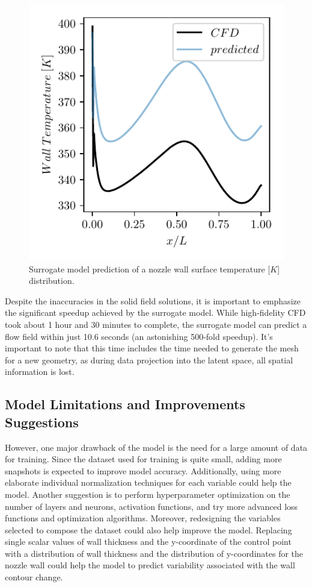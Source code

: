 \documentclass[10pt,oneside,a4paper,twocolumn]{article}
\begin{document}
\begin{figure}[htbp]
  \centering
  \includegraphics[width=\columnwidth]{figures/predicted_wall_temperature.pdf}
  \caption{Surrogate model prediction of a nozzle wall surface temperature [$K$] distribution.}
  \label{fig:wall_temperature_solid_wall}
\end{figure}

Despite the inaccuracies in the solid field solutions, it is important to emphasize the significant speedup achieved by the surrogate model. While high-fidelity CFD took about 1 hour and 30 minutes to complete, the surrogate model can predict a flow field within just 10.6 seconds (an astonishing 500-fold speedup). It's important to note that this time includes the time needed to generate the mesh for a new geometry, as during data projection into the latent space, all spatial information is lost.

\subsection{Model Limitations and Improvements Suggestions}

However, one major drawback of the model is the need for a large amount of data for training. Since the dataset used for training is quite small, adding more snapshots is expected to improve model accuracy. Additionally, using more elaborate individual normalization techniques for each variable could help the model. Another suggestion is to perform hyperparameter optimization on the number of layers and neurons, activation functions, and try more advanced loss functions and optimization algorithms. Moreover, redesigning the variables selected to compose the dataset could also help improve the model. Replacing single scalar values of wall thickness and the y-coordinate of the control point with a distribution of wall thickness and the distribution of y-coordinates for the nozzle wall could help the model to predict variability associated with the wall contour change.
\end{document}
